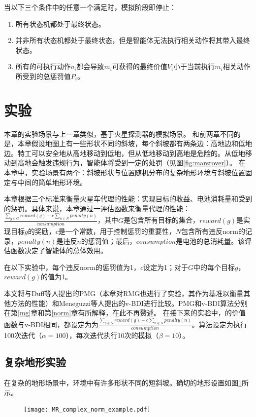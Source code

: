 当以下三个条件中的任意一个满足时，模拟阶段即停止：
\begin{enumerate}
  \item 所有状态机都处于最终状态。
  \item 并非所有状态机都处于最终状态，但是智能体无法执行相关动作将其带入最终状态。
  \item 所有的可执行动作$a_i$都会导致$m_i$可获得的最终价值$V_i$小于当前执行$m_i$相关动作所受到的总惩罚值$P_i$。
\end{enumerate}

\section{实验}
本章的实验场景与上一章类似，基于火星探测器的模拟场景。
和前两章不同的是，本章假设地图上有一些形状不同的斜坡，每个斜坡都有两条边：高地边和低地边。特工可以安全地从高地移动到低地，但从低地移动到高地是危险的。从低地移动到高地会触发违规行为，智能体将受到一定的处罚（见图\ref{fig:marsrover}）。
在本章中，实验场景有两个：斜坡形状与位置随机分布的复杂地形环境与斜坡位置固定与中间的简单地形环境。

本章根据三个标准来衡量火星车代理的性能：实现目标的收益、电池消耗量和受到的惩罚。具体来说，本章通过一评估函数来衡量代理的性能：$\frac{\sum_{g \in G} reward(g) - c\sum_{n \in N} penalty(n)}{consumption}$，其中$G$是包含所有目标的集合，$reward(g)$是实现目标$g$的奖励，$c$是一个常数，用于控制惩罚的重要性，$N$包含所有违反norm的记录，$penalty(n)$是违反$n$的惩罚值；最后，$consumption$是电池的总消耗量。该评估函数决定了智能体的总体效用。

在以下实验中，每个违反norm的惩罚值为1，$c$设定为1；对于$G$中的每个目标$g$，$reward(g)$的值为1。

本文将\SAN 与Duff等人\cite{DBLP:conf/atal/DuffHT06}提出的PMG（本章对RMG也进行了实验，其作为基准以衡量其他方法的性能）和Meneguzzi等人\cite{DBLP:journals/eaai/MeneguzziROVL15}提出的v-BDI进行比较。PMG和v-BDI算法分别在第\ref{mg}章和第\ref{norm}章有所解释，在此不再赘述。
在接下来的实验中，\SAN 的价值函数与v-BDI相同，都设定为为$\frac{\sum_{g \in G} reward(g) - c\sum_{n \in N} penalty(n)}{consumption}$。\SAN 算法设定为执行100次迭代（$\alpha = 100$），每次迭代执行10次的模拟（$\beta = 10$）。

\subsection{复杂地形实验}
在复杂的地形场景中，环境中有许多形状不同的短斜坡。确切的地形设置如图\ref{fig:complex}所示。
\begin{figure}[H]
\centering
\texttt{[image: MR\_complex\_norm\_example.pdf]}
\captionsetup{justification=centering}
\label{fig:complex}
\end{figure}

